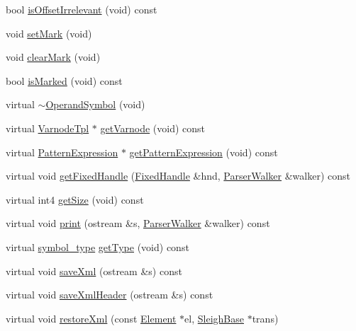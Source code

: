 \begin{DoxyCompactItemize}
\item 
bool \mbox{\hyperlink{class_operand_symbol_aaabb092dd61abe21c855a35443397809}{is\+Offset\+Irrelevant}} (void) const
\item 
void \mbox{\hyperlink{class_operand_symbol_a0b306a07c71c5d101a160c776cccb961}{set\+Mark}} (void)
\item 
void \mbox{\hyperlink{class_operand_symbol_ae0ccaa8ae25f40be2ac5420200fd899e}{clear\+Mark}} (void)
\item 
bool \mbox{\hyperlink{class_operand_symbol_a284c4038e0c1de1edee67f872b7debc9}{is\+Marked}} (void) const
\item 
virtual \mbox{\hyperlink{class_operand_symbol_a1949a4b5a8e32481e7b4e01a7ff226b1}{$\sim$\+Operand\+Symbol}} (void)
\item 
virtual \mbox{\hyperlink{class_varnode_tpl}{Varnode\+Tpl}} $\ast$ \mbox{\hyperlink{class_operand_symbol_a62fb73d10c92f1dd39977abe47f557d2}{get\+Varnode}} (void) const
\item 
virtual \mbox{\hyperlink{class_pattern_expression}{Pattern\+Expression}} $\ast$ \mbox{\hyperlink{class_operand_symbol_aaebd25df34fa9100b22e3df9272d2910}{get\+Pattern\+Expression}} (void) const
\item 
virtual void \mbox{\hyperlink{class_operand_symbol_a292e9cb914a17155467e7e1f0572021c}{get\+Fixed\+Handle}} (\mbox{\hyperlink{struct_fixed_handle}{Fixed\+Handle}} \&hnd, \mbox{\hyperlink{class_parser_walker}{Parser\+Walker}} \&walker) const
\item 
virtual int4 \mbox{\hyperlink{class_operand_symbol_a9082a923e1e8f929c9fc0409f14fac74}{get\+Size}} (void) const
\item 
virtual void \mbox{\hyperlink{class_operand_symbol_a6aae865579741ebe784ba0782c0192ec}{print}} (ostream \&s, \mbox{\hyperlink{class_parser_walker}{Parser\+Walker}} \&walker) const
\item 
virtual \mbox{\hyperlink{class_sleigh_symbol_aba70f7f332fd63488c5ec4bd7807db41}{symbol\+\_\+type}} \mbox{\hyperlink{class_operand_symbol_aef01562ac38960c6b9fe99ecd574b6f6}{get\+Type}} (void) const
\item 
virtual void \mbox{\hyperlink{class_operand_symbol_a20b491e8a76d47973fe52df326d9ce38}{save\+Xml}} (ostream \&s) const
\item 
virtual void \mbox{\hyperlink{class_operand_symbol_a9cdbc0cf454ad7ed2b3683100a4a8de0}{save\+Xml\+Header}} (ostream \&s) const
\item 
virtual void \mbox{\hyperlink{class_operand_symbol_a89eb88d3d81b27fae7432adf31d2d27a}{restore\+Xml}} (const \mbox{\hyperlink{class_element}{Element}} $\ast$el, \mbox{\hyperlink{class_sleigh_base}{Sleigh\+Base}} $\ast$trans)
\end{DoxyCompactItemize}
